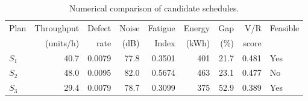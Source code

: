 \begin{table}[htbp]
\centering
\caption{Numerical comparison of candidate schedules.}
\label{tab:numerical-sim}
\small
\begin{tabular}{@{}lrrrrrrrl@{}}
\toprule
Plan & Throughput & Defect & Noise & Fatigue & Energy & Gap & V/R & Feasible \\
     & (units/h)  & rate   & (dB)  & Index   & (kWh)  & (\%) & score &         \\
\midrule
$S_{1}$ & 40.7 & 0.0079 & 77.8 & 0.3501 & 401 & 21.7 & 0.481 & Yes \\
$S_{2}$ & 48.0 & 0.0095 & 82.0 & 0.5674 & 463 & 23.1 & 0.477 & No \\
$S_{3}$ & 29.4 & 0.0079 & 78.7 & 0.3099 & 375 & 52.9 & 0.389 & Yes \\
\bottomrule
\end{tabular}
\end{table}
